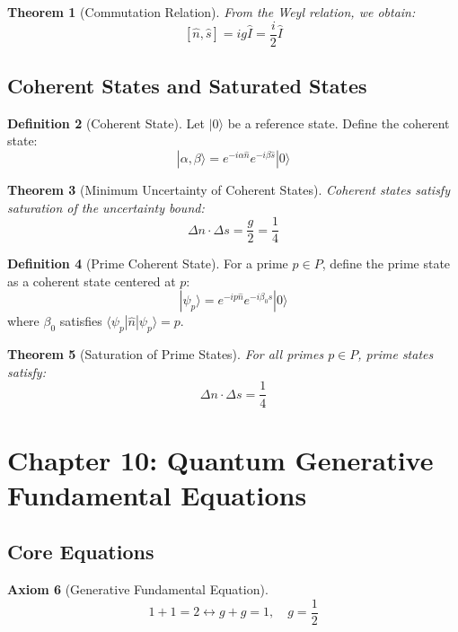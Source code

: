 \documentclass[12pt]{article}
\newtheorem{theorem}{Theorem}[section]
\theoremstyle{definition}
\newtheorem{definition}[theorem]{Definition}
\newtheorem{axiom}[theorem]{Axiom}
\begin{document}
\begin{theorem}[Commutation Relation]
From the Weyl relation, we obtain:
\[
[\hat{n}, \hat{s}] = ig\hat{I} = \frac{i}{2}\hat{I}
\]
\end{theorem}

\subsection{Coherent States and Saturated States}

\begin{definition}[Coherent State]
Let \(|0\rangle\) be a reference state. Define the coherent state:
\[
|\alpha,\beta\rangle = e^{-i\alpha\hat{n}} e^{-i\beta\hat{s}} |0\rangle
\]
\end{definition}

\begin{theorem}[Minimum Uncertainty of Coherent States]
Coherent states satisfy saturation of the uncertainty bound:
\[
\Delta n \cdot \Delta s = \frac{g}{2} = \frac{1}{4}
\]
\end{theorem}

\begin{definition}[Prime Coherent State]
For a prime \(p \in P\), define the prime state as a coherent state centered at \(p\):
\[
|\psi_p\rangle = e^{-ip\hat{n}} e^{-i\beta_0\hat{s}} |0\rangle
\]
where \(\beta_0\) satisfies \(\langle\psi_p|\hat{n}|\psi_p\rangle = p\).
\end{definition}

\begin{theorem}[Saturation of Prime States]
For all primes \(p \in P\), prime states satisfy:
\[
\Delta n \cdot \Delta s = \frac{1}{4}
\]
\end{theorem}

\section{Chapter 10: Quantum Generative Fundamental Equations}

\subsection{Core Equations}

\begin{axiom}[Generative Fundamental Equation]
\[
1+1=2 \longleftrightarrow g+g=1,\quad g=\frac{1}{2}
\]
\end{axiom}
\end{document}
